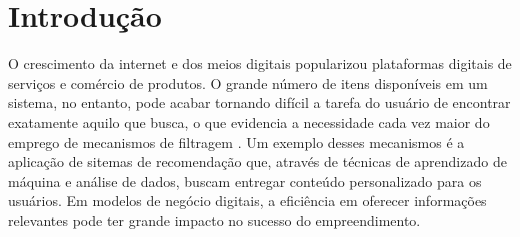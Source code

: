 \documentclass[
	12pt,				%
    oneside,			%
	a4paper,			%
	english,			%
	french,				%
	spanish,			%
	brazil,				%
	]{abntex2}
\begin{document}

\cleardoublepage %


\cleardoublepage




\tableofcontents*


\textual


\chapter{Introdução} %

O crescimento da internet e dos meios digitais popularizou plataformas digitais de serviços e comércio de produtos.
O grande número de itens disponíveis em um  sistema, no entanto, pode acabar tornando difícil a tarefa do usuário de encontrar exatamente aquilo que busca,
 o que evidencia a necessidade cada vez maior do emprego de mecanismos de filtragem
. Um exemplo desses mecanismos é a aplicação de sitemas de recomendação que, através de técnicas
de aprendizado de máquina e análise de dados, buscam entregar conteúdo personalizado para os usuários. Em modelos de negócio digitais, a eficiência em 
oferecer informações relevantes pode ter grande impacto no sucesso do empreendimento.
\end{document}
